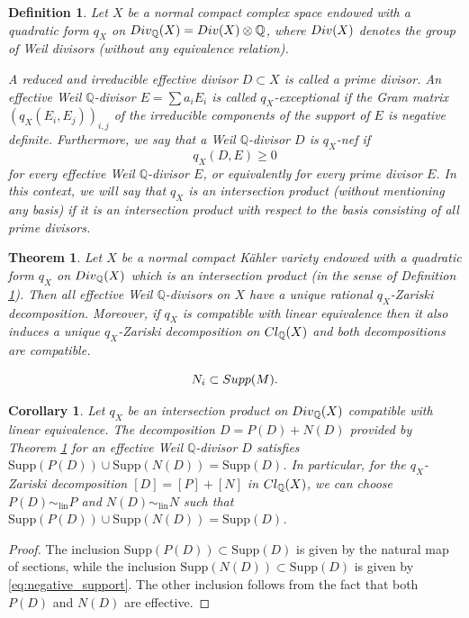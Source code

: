 \documentclass[10pt,a4paper]{amsart}
\newtheorem{definition}{Definition}
\newtheorem{thm}{Theorem}
\newtheorem{cor}{Corollary}
\def\Cl{\mathop{\rm Cl}\nolimits}
\def\Div{\mathop{\rm Div}\nolimits}
\def\Q{{\mathbb Q}}
\def\supp{\mathop{\rm Supp}\nolimits}
\begin{document}
\begin{definition} \label{prime} 
Let $X$ be a normal compact complex space endowed with a quadratic form $q_{X}$ on $\Div_{\Q}(X)=\Div(X)\otimes \Q$, where $\Div(X)$ denotes the group of Weil divisors (without any equivalence relation).

A reduced and irreducible effective divisor $D\subset X$ is called a prime divisor. An effective Weil $\Q$-divisor $E=\sum a_i E_i$ 
is called $q_{X}$-exceptional if the Gram matrix   $(q_{X}(E_i,E_j))_{i,j}$ of the irreducible components of the support of $E$ 
is negative definite.  
Furthermore, we say that a Weil $\Q$-divisor $D$ is $q_{X}$-nef if 
$$q_{X}(D,E)\geq 0 $$ 
for every effective 
Weil $\Q$-divisor $E$, or equivalently for every prime divisor $E$.
In this context, we will say that $q_X$ is an intersection product (without mentioning any basis) if it is an intersection product with respect to the basis consisting of all prime divisors.
\end{definition}

\begin{thm}\label{thm:q-Zar}
Let $X$ be a normal compact K\"ahler variety endowed with a quadratic form $q_{X}$ on  $\Div_{\Q}(X)$ which is an intersection product  (in the sense of Definition \ref{prime}).
Then all effective Weil $\Q$-divisors on $X$ have a unique rational  $q_{X}$-Zariski decomposition. Moreover, if $q_X$ is compatible with linear equivalence then it also induces a unique $q_X$-Zariski decomposition on $\Cl_{\Q}(X)$ and both decompositions are compatible.
\end{thm}

\begin{equation}\label{eq:negative_support}
 N_i \subset \supp(M).
\end{equation}

\begin{cor} Let $q_X$ be an intersection product on $\Div_{\Q}(X)$ compatible with linear equivalence.  The decomposition  $D= P(D) + N(D)$ provided by Theorem \ref{thm:q-Zar} for an effective Weil $\Q$-divisor $D$  satisfies $\mathrm{Supp} (P(D))\cup \mathrm{Supp} (N(D))=\mathrm{Supp} (D)$. In particular, for the $q_X$-Zariski decomposition $[D]=[P]+[N] $ in $\Cl_{\Q}(X)$, we can choose $P(D)\sim_{\mathrm{lin}} P$ and  $N(D)\sim_{\mathrm{lin}} N$ such that $\mathrm{Supp} (P(D))\cup \mathrm{Supp} (N(D))=\mathrm{Supp} (D)$.
\end{cor}

\begin{proof}
The inclusion $\mathrm{Supp} (P(D))\subset \mathrm{Supp}(D)$ is given by the natural map of sections, while the inclusion $\mathrm{Supp} (N(D))\subset \mathrm{Supp}(D)$ is given by \eqref{eq:negative_support}. The other inclusion follows from the fact that both $P(D)$ and $N(D)$ are effective.
\end{proof}
\end{document}
